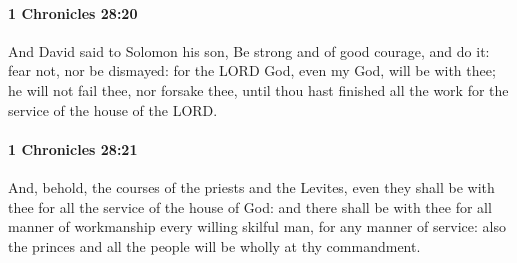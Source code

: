 		\paragraph{1 Chronicles 28:20} %
			\label{1CHRONICLES-28-20}

			And David said to Solomon his son, Be strong and of good courage, and do it: fear not, nor be dismayed: for the LORD God, even my God, will be with thee; he will not fail thee, nor forsake thee, until thou hast finished all the work for the service of the house of the LORD.


		\paragraph{1 Chronicles 28:21} %
			\label{1CHRONICLES-28-21}

			And, behold, the courses of the priests and the Levites, even they shall be with thee for all the service of the house of God: and there shall be with thee for all manner of workmanship every willing skilful man, for any manner of service: also the princes and all the people will be wholly at thy commandment.

